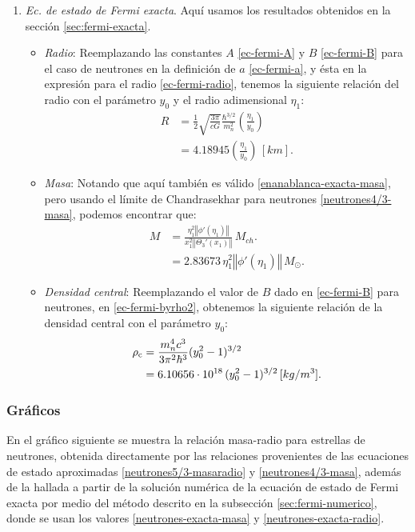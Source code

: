 \begin{enumerate}
\item \emph{Ec. de estado de Fermi exacta}. Aquí usamos los resultados obtenidos en la sección \eqref{sec:fermi-exacta}.
\begin{itemize}
\item \emph{Radio}: Reemplazando las constantes $A$ \eqref{ec-fermi-A} y $B$ \eqref{ec-fermi-B} para el caso de neutrones en la definición de $a$ \eqref{ec-fermi-a}, y ésta en la expresión para el radio \eqref{ec-fermi-radio}, tenemos la siguiente relación del radio con el parámetro $y_0$ y el radio adimensional $\eta_1$:
\begin{align}
R&=\frac{1}{2}\sqrt{\frac{3\pi}{cG}}\frac{\hbar^{3/2}}{m_n^2}\left(\frac{\eta_1}{y_0}\right)\\
&=4.18945\left(\frac{\eta_1}{y_0}\right)\,[km].\label{neutrones-exacta-radio}
\end{align}
\item \emph{Masa}: Notando que aquí también es válido \eqref{enanablanca-exacta-masa}, pero usando el límite de Chandrasekhar para neutrones \eqref{neutrones4/3-masa}, podemos encontrar que:
\begin{align}
M&=\frac{\eta_1^2\left\Vert\phi'(\eta_1)\right\Vert}{x_1^2\left\Vert\Theta_3'(x_1)\right\Vert}\,M_{ch}.\\
&=2.83673\,\eta_1^2\left\Vert\phi'(\eta_1)\right\Vert\, M_{\odot}.\label{neutrones-exacta-masa}
\end{align}
\item \emph{Densidad central}: Reemplazando el valor de $B$ dado en \eqref{ec-fermi-B} para neutrones, en \eqref{ec-fermi-byrho2}, obtenemos la siguiente relación de la densidad central con el parámetro $y_0$:
\begin{align}
\rho_{\rm c}&=\frac{m_n^4 c^3}{3\pi^2\hbar^3}(y_0^2-1)^{3/2}\\
&=6.10656\cdot10^{18}\,(y_0^2-1)^{3/2}\,[kg/m^3].\label{neutrones-exacta-densidad}
\end{align}
\end{itemize}


\end{enumerate}

\subsubsection{Gráficos}
En el gráfico siguiente se muestra la relación masa-radio para estrellas de neutrones, obtenida directamente por las relaciones provenientes de las ecuaciones de estado aproximadas \eqref{neutrones5/3-masaradio} y \eqref{neutrones4/3-masa}, además de la hallada a partir de la solución numérica de la ecuación de estado de Fermi exacta por medio del método descrito en la subsección \ref{sec:fermi-numerico}, donde se usan los valores \eqref{neutrones-exacta-masa} y \eqref{neutrones-exacta-radio}.


